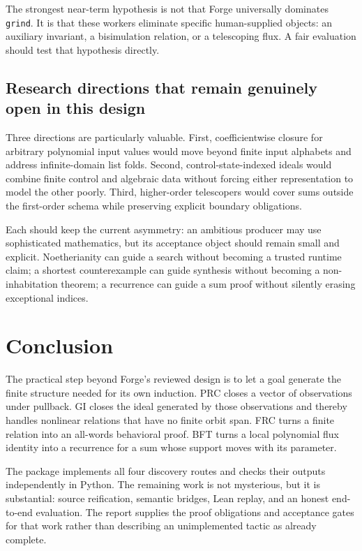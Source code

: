 The strongest near-term hypothesis is not that Forge universally dominates \texttt{grind}. It is that these workers eliminate specific human-supplied objects: an auxiliary invariant, a bisimulation relation, or a telescoping flux. A fair evaluation should test that hypothesis directly.

\subsection{Research directions that remain genuinely open in this design}

Three directions are particularly valuable. First, coefficientwise closure for arbitrary polynomial input values would move beyond finite input alphabets and address infinite-domain list folds. Second, control-state-indexed ideals would combine finite control and algebraic data without forcing either representation to model the other poorly. Third, higher-order telescopers would cover sums outside the first-order schema while preserving explicit boundary obligations.

Each should keep the current asymmetry: an ambitious producer may use sophisticated mathematics, but its acceptance object should remain small and explicit. Noetherianity can guide a search without becoming a trusted runtime claim; a shortest counterexample can guide synthesis without becoming a non-inhabitation theorem; a recurrence can guide a sum proof without silently erasing exceptional indices.

\section{Conclusion}

The practical step beyond Forge's reviewed design is to let a goal generate the finite structure needed for its own induction. PRC closes a vector of observations under pullback. GI closes the ideal generated by those observations and thereby handles nonlinear relations that have no finite orbit span. FRC turns a finite relation into an all-words behavioral proof. BFT turns a local polynomial flux identity into a recurrence for a sum whose support moves with its parameter.

The package implements all four discovery routes and checks their outputs independently in Python. The remaining work is not mysterious, but it is substantial: source reification, semantic bridges, Lean replay, and an honest end-to-end evaluation. The report supplies the proof obligations and acceptance gates for that work rather than describing an unimplemented tactic as already complete.
